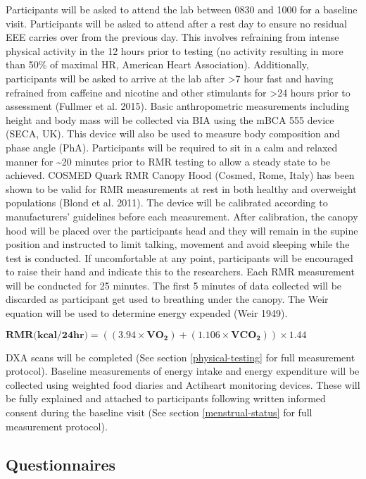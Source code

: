 \documentclass[
]{article}
\begin{document}
Participants will be asked to attend the lab between 0830 and 1000 for a baseline visit. Participants will be asked to attend after a rest day to ensure no residual EEE carries over from the previous day. This involves refraining from intense physical activity in the 12 hours prior to testing (no activity resulting in more than 50\% of maximal HR, American Heart Association). Additionally, participants will be asked to arrive at the lab after \textgreater7 hour fast and having refrained from caffeine and nicotine and other stimulants for \textgreater24 hours prior to assessment (Fullmer et al. 2015). Basic anthropometric measurements including height and body mass will be collected via BIA using the mBCA 555 device (SECA, UK). This device will also be used to measure body composition and phase angle (PhA). Participants will be required to sit in a calm and relaxed manner for \textasciitilde20 minutes prior to RMR testing to allow a steady state to be achieved. COSMED Quark RMR Canopy Hood (Cosmed, Rome, Italy) has been shown to be valid for RMR measurements at rest in both healthy and overweight populations (Blond et al. 2011). The device will be calibrated according to manufacturers' guidelines before each measurement. After calibration, the canopy hood will be placed over the participants head and they will remain in the supine position and instructed to limit talking, movement and avoid sleeping while the test is conducted. If uncomfortable at any point, participants will be encouraged to raise their hand and indicate this to the researchers. Each RMR measurement will be conducted for 25 minutes. The first 5 minutes of data collected will be discarded as participant get used to breathing under the canopy. The Weir equation will be used to determine energy expended (Weir 1949).

\textbf{\(\boldsymbol{\text{RMR(kcal/24hr)} = ((3.94 \times VO_2) + (1.106 \times VCO_2)) \times 1.44}\)}

DXA scans will be completed (See section \ref{physical-testing} for full measurement protocol). Baseline measurements of energy intake and energy expenditure will be collected using weighted food diaries and Actiheart monitoring devices. These will be fully explained and attached to participants following written informed consent during the baseline visit (See section \ref{menstrual-status} for full measurement protocol).

\subsection{Questionnaires}\label{questionnaires}
\end{document}
